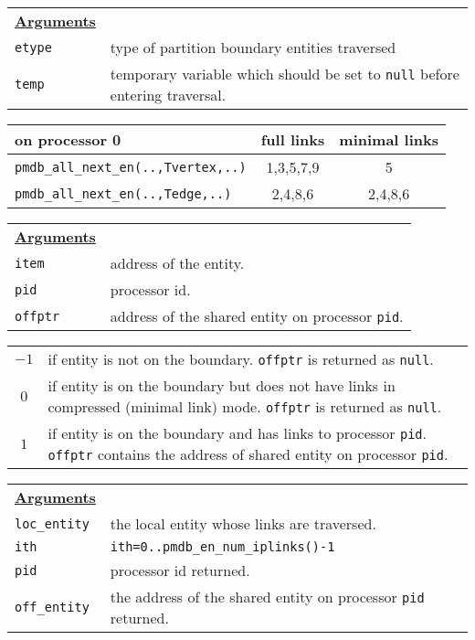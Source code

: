 {\newpage
\clearpage
\samepage \begin{tabular}{p{1.0in}p{4.9in}}
{\bf \underline{Arguments}} & \\  

\verb$etype$    &   type of partition boundary entities traversed \\  
\verb$temp$     &   temporary variable which should be set to \verb$null$ 
                    before entering traversal.\\  

\end{tabular}
}

{\newpage
\clearpage
\samepage \begin{tabular}{|l|c|c|} \hline 
on processor 0  & full links  & minimal links                  \\  \hline \hline
{\tt pmdb\_all\_next\_en(..,Tvertex,..)} & 1,3,5,7,9 & 5       \\  \hline 
{\tt pmdb\_all\_next\_en(..,Tedge,..) }  &  2,4,8,6  & 2,4,8,6  \\  \hline 
\end{tabular}
}

{\newpage
\clearpage
\samepage \begin{tabular}{p{1.0in}p{4.9in}}
{\bf \underline{Arguments}} & \\  

\verb$item$   & address of the entity. \\  
\verb$pid$    & processor id.          \\  
\verb$offptr$ & address of the shared entity on processor \verb$pid$.

\end{tabular}
}

{\newpage
\clearpage
\samepage \begin{tabular}{cp{4.9in}}
 $-1$  &  if entity is not on the boundary.
           \verb$offptr$ is returned as \verb$null$. \\ 
 $0$   &  if entity is on the boundary but does not have  
          links  in compressed (minimal link) mode. 
           \verb$offptr$ is returned as \verb$null$. \\ 
 $1 $  &  if entity is on the boundary and has links to processor 
          \verb$pid$. \verb$offptr$ contains  the address of shared 
          entity on processor \verb$pid$. \\ 
\end{tabular}
}

{\newpage
\clearpage
\samepage \begin{tabular}{p{1.0in}p{4.9in}}
{\bf \underline{Arguments}} & \\  

{\tt loc\_entity} & the local entity whose links are traversed.\\  
\verb$ith$        &  {\tt ith=0..pmdb\_en\_num\_iplinks()-1}   \\  
\verb$pid$        & processor id returned. \\  
{\tt off\_entity}  &  the address of the shared entity on processor \verb$pid$ 
                     returned.\\  

\end{tabular}
}

